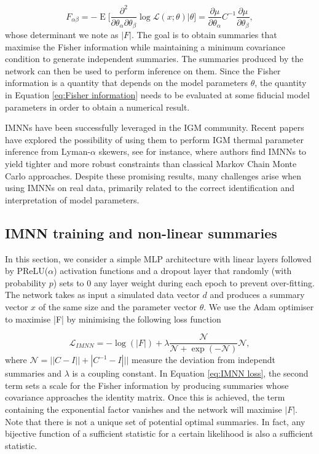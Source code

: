 \begin{equation}\label{eq:Fisher information}
    F_{\alpha \beta} =-\operatorname{E}\bigg[\frac{\partial^2}{\partial\theta_\alpha\partial\theta_\beta}\log \mathcal{L}(x;\theta)\bigg|\theta\bigg]= \frac{\partial \mu}{\partial \theta_\alpha}C^{-1} \frac{\partial \mu}{\partial \theta_\beta},
\end{equation}
whose determinant we note as $|F|$. 
The goal is to obtain summaries that maximise the Fisher information while maintaining a minimum covariance condition to generate independent summaries. The summaries produced by the network can then be used to perform inference on them. Since the Fisher information is a quantity that depends on the model parameters $\theta$, the quantity in Equation \ref{eq:Fisher information} needs to be evaluated at some fiducial model parameters in order to obtain a numerical result.

IMNNs have been successfully leveraged in the IGM community. Recent papers have explored the possibility of using them to perform IGM thermal parameter inference from Lyman-$\alpha$ skewers, see \cite{maitra2024parameterestimationlyalphaforest} for instance, where authors find IMNNs to yield tighter and more robust constraints than classical Markov Chain Monte Carlo approaches. Despite these promising results, many challenges arise when using IMNNs on real data, primarily related to the correct identification and interpretation of model parameters.

\subsection{IMNN training and non-linear summaries}
In this section, we consider a simple MLP architecture with linear layers followed by PReLU($\alpha$) activation functions and a dropout layer that randomly (with probability $p$) sets to 0 any layer weight during each epoch to prevent over-fitting. The network takes as input a simulated data vector $d$ and produces a summary vector $x$ of the same size and the parameter vector $\theta$. We use the Adam optimiser to maximise |F| by minimising the following loss function

\begin{equation}\label{eq:IMNN loss}
    \mathcal{L}_{IMNN} = - \log(|F|) + \lambda \frac{\mathcal{N}}{\mathcal{N}+\exp(-\mathcal{N})} \mathcal{N},
\end{equation}
where $\mathcal{N}=||C-I||+|C^{-1}-I|||$ measure the deviation from independt summaries and $\lambda$ is a coupling constant. In Equation \ref{eq:IMNN loss}, the second term sets a scale for the Fisher information by producing summaries whose covariance approaches the identity matrix. Once this is achieved, the term containing the exponential factor vanishes and the network will maximise $|F|$. Note that there is not a unique set of potential optimal summaries. In fact, any bijective function of a sufficient statistic for a certain likelihood is also a sufficient statistic.

